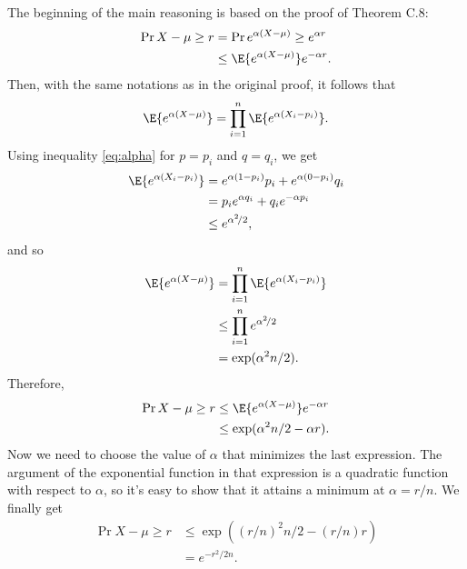The beginning of the main reasoning is based on the proof of Theorem C.8:
\begin{align*}
    \Pr{X-\mu\ge r} &= \Pr{e^{\alpha(X-\mu)}\ge e^{\alpha r}} \\
    &\le \E{e^{\alpha(X-\mu)}}e^{-\alpha r}.
\end{align*}
Then, with the same notations as in the original proof, it follows that
\[
    \E{e^{\alpha(X-\mu)}} = \prod_{i=1}^n\E{e^{\alpha(X_i-p_i)}}.
\]
Using inequality \eqref{eq:alpha} for $p=p_i$ and $q=q_i$, we get
\begin{align*}
    \E{e^{\alpha(X_i-p_i)}} &= e^{\alpha(1-p_i)}p_i+e^{\alpha(0-p_i)}q_i \\
    &= p_ie^{\alpha q_i}+q_ie^{-\alpha p_i} \\
    &\le e^{\alpha^2\!/2},
\end{align*}
and so
\begin{align*}
    \E{e^{\alpha(X-\mu)}} &= \prod_{i=1}^n\E{e^{\alpha(X_i-p_i)}} \\
    &\le \prod_{i=1}^ne^{\alpha^2\!/2} \\
    &= \exp(\alpha^2n/2).
\end{align*}
Therefore,
\begin{align*}
    \Pr{X-\mu\ge r} &\le \E{e^{\alpha(X-\mu)}}e^{-\alpha r} \\
    &\le \exp(\alpha^2n/2-\alpha r).
\end{align*}
Now we need to choose the value of $\alpha$ that minimizes the last expression.
The argument of the exponential function in that expression is a quadratic function with respect to $\alpha$, so it's easy to show that it attains a minimum at $\alpha=r/n$.
We finally get
\begin{align*}
    \Pr{X-\mu\ge r} &\le \exp\left((r/n)^2n/2-(r/n)r\right) \\
    &= e^{-r^2\!/{2n}}.
\end{align*}

